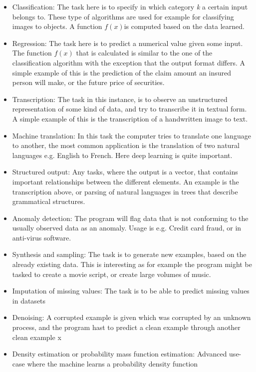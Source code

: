 \documentclass[12pt]{article}
\begin{document}
\begin{itemize}
    \item Classification: The task here is to specify in which category \textit{k} a certain input belongs to. These type of algorithms are used for example for classifying images to objects. A function $f(x)$is computed based on the data learned.
    \item Regression: The task here is to predict a numerical value given some input. The function $f(x)$ that is calculated is similar to the one of the classification algorithm with the exception that the output format differs. A simple example of this is the prediction of the claim amount an insured person will make, or the future price of securities.
    \item Transcription: The task in this instance, is to observe an unstructured representation of some kind of data, and try to transcribe it in textual form. A simple example of this is the transcription of a handwritten image to text.
    \item Machine translation: In this task the computer tries to translate one language to another, the most common application is the translation of two natural languages e.g. English to French. Here deep learning is quite important.
    \item Structured output: Any tasks, where the output is a vector, that contains important relationships between the different elements. An example is the transcription above, or parsing of natural languages in trees that describe grammatical structures.
    \item Anomaly detection: The program will flag data that is not conforming to the usually observed data as an anomaly. Usage is e.g. Credit card fraud, or in anti-virus software.
    \item Synthesis and sampling: The task is to generate new examples, based on the already existing data. This is interesting as for example the program might be tasked to create a movie script, or create large volumes of music.
    \item Imputation of missing values: The task is to be able to predict missing values in datasets
    \item Denoising: A corrupted example is given which was corrupted by an unknown process, and the program hast to predict a clean example through another clean example x
    \item Density estimation or probability mass function estimation:  Advanced use-case where the machine learns a probability density function
\end{itemize}
\end{document}
